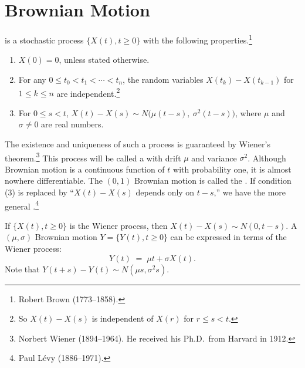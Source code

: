 \section{Brownian Motion}
\label{sec:brownian-motion}


\begin{definition}
	 is a stochastic process $\{X(t),t\ge0\}$ with the following properties.\footnote{Robert Brown (1773--1858).}
	\begin{enumerate}[(1),nosep]
		\item $X(0)=0$, unless stated otherwise.
		\item For any $0\le t_{0}<t_{1}<\cdots<t_{n}$, the random variables $X(t_{k})-X(t_{k-1})$ for $1\le k\le n$ are independent.\footnote{So $X(t)-X(s)$ is independent of $X(r)$ for $r\le s<t$.}
		\item For $0\le s<t$, $X(t)-X(s)\sim N\bigl(\mu(t-s),\ \sigma^{2}(t-s)\bigr)$, where $\mu$ and $\sigma\ne0$ are real numbers.
	\end{enumerate}
\end{definition}

The existence and uniqueness of such a process is guaranteed by Wiener's theorem.\footnote{Norbert Wiener (1894--1964). He received his Ph.D.\ from Harvard in 1912.}
This process will be called a  with drift $\mu$ and variance $\sigma^{2}$.
Although Brownian motion is a continuous function of $t$ with probability one, it is almost nowhere differentiable.
The $(0,1)$ Brownian motion is called the .
If condition (3) is replaced by ``$X(t)-X(s)$ depends only on $t-s$,'' we have the more general .\footnote{Paul L\'evy (1886--1971).}

\suppstart
{}
\suppend


\begin{eg}
	If $\{X(t),t\ge0\}$ is the Wiener process, then $X(t)-X(s)\sim N(0,t-s)$.
	A $(\mu,\sigma)$ Brownian motion $Y=\{Y(t),t\ge0\}$ can be expressed in terms of the Wiener process:
	\begin{equation}
		Y(t) \;=\; \mu t+\sigma X(t) .
		\label{eq:bm-wiener}
	\end{equation}
	Note that $Y(t+s)-Y(t)\sim N(\mu s,\sigma^{2}s)$.
\end{eg}

